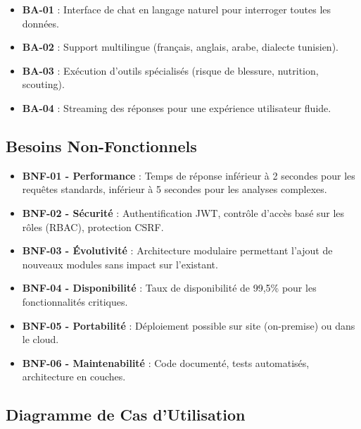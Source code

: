 \begin{itemize}
    \item \textbf{BA-01} : Interface de chat en langage naturel pour interroger toutes les données.
    \item \textbf{BA-02} : Support multilingue (français, anglais, arabe, dialecte tunisien).
    \item \textbf{BA-03} : Exécution d'outils spécialisés (risque de blessure, nutrition, scouting).
    \item \textbf{BA-04} : Streaming des réponses pour une expérience utilisateur fluide.
\end{itemize}

\subsection{Besoins Non-Fonctionnels}

\begin{itemize}
    \item \textbf{BNF-01 - Performance} : Temps de réponse inférieur à 2 secondes pour les requêtes standards, inférieur à 5 secondes pour les analyses complexes.
    \item \textbf{BNF-02 - Sécurité} : Authentification JWT, contrôle d'accès basé sur les rôles (RBAC), protection CSRF.
    \item \textbf{BNF-03 - Évolutivité} : Architecture modulaire permettant l'ajout de nouveaux modules sans impact sur l'existant.
    \item \textbf{BNF-04 - Disponibilité} : Taux de disponibilité de 99,5\% pour les fonctionnalités critiques.
    \item \textbf{BNF-05 - Portabilité} : Déploiement possible sur site (on-premise) ou dans le cloud.
    \item \textbf{BNF-06 - Maintenabilité} : Code documenté, tests automatisés, architecture en couches.
\end{itemize}

\subsection{Diagramme de Cas d'Utilisation}

